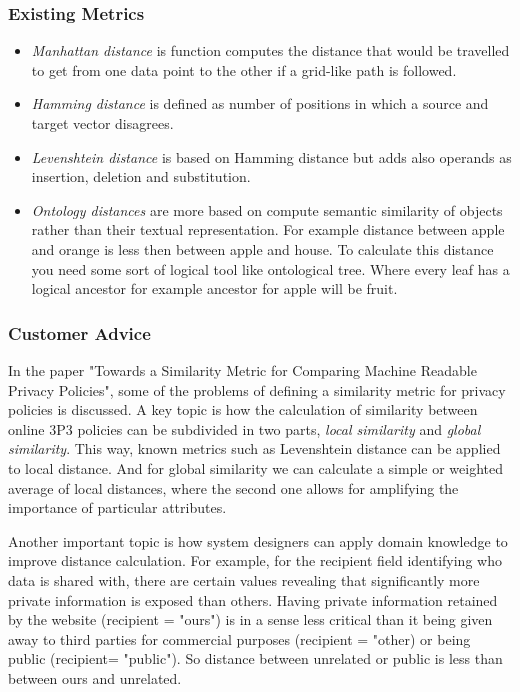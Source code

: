 
\subsubsection{Existing Metrics}

\begin{itemize}
\item \emph{Manhattan distance} is function computes the distance that would be travelled to get from one data point to the other if a grid-like path is followed. 
\item \emph{Hamming distance} is defined as number of positions in which a source and target vector disagrees.
\item \emph{Levenshtein distance} is based on Hamming distance but adds also operands as insertion, deletion and substitution. 
\item \emph{Ontology distances} are more based on compute semantic similarity of objects rather than their textual representation. For example distance between apple and orange is less then between apple and house. To calculate this distance you need some sort of logical tool like ontological tree. Where every leaf has a logical ancestor for example ancestor for apple will be fruit.
\end{itemize}
\subsubsection{Customer Advice}

In the paper "Towards a Similarity Metric for Comparing Machine Readable Privacy Policies", some of the problems of defining a similarity metric for privacy policies is discussed. A key topic is how the calculation of similarity between online 3P3 policies can be subdivided in two parts, \emph{local similarity} and \emph{global similarity}. This way, known metrics such as Levenshtein distance  can be applied to local distance. And for global similarity we can calculate a simple or weighted average of local distances, where the second one allows for amplifying the importance of particular attributes.

Another important topic is how system designers can apply domain knowledge to improve distance calculation. For example, for the recipient field identifying who data is shared with, there are certain values revealing that significantly more private information is exposed than others. Having private information retained by the website (recipient = "ours") is in a sense less critical than it being given away to third parties for commercial purposes (recipient = "other) or being public (recipient= "public"). So distance between unrelated or public is less than between ours and unrelated.

